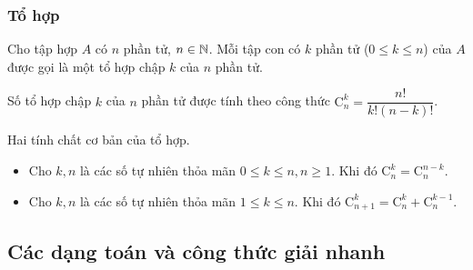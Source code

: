 \subsubsection{Tổ hợp}
\begin{dn}
	Cho tập hợp $A$ có $n$ phần tử,  $n\in \Bbb N$. Mỗi tập con có $k$ phần tử ($0\le k \le n$) của $A$ được gọi là một tổ hợp chập $k$ của $n$ phần tử.
\end{dn}
\begin{dl}
	Số tổ hợp chập $k$ của $n$ phần tử được tính theo công thức $\mathrm{C}^k_n = \dfrac{n!}{k!(n-k)!}$.
\end{dl}

\begin{dl}
	Hai tính chất cơ bản của tổ hợp.
	\begin{itemize}
	\item Cho $k,n$ là các số tự nhiên thỏa mãn $0\le k \le n, n \ge 1$. Khi đó $\mathrm{C}^k_n =\mathrm{C}^{n-k}_n $.
	\item Cho $k,n$ là các số tự nhiên thỏa mãn $1\le k \le n$. Khi đó $\mathrm{C}^k_{n+1}=\mathrm{C}^k_n + \mathrm{C}^{k-1}_n$.
	\end{itemize}
\end{dl}

\subsection{Các dạng toán và công thức giải nhanh}

